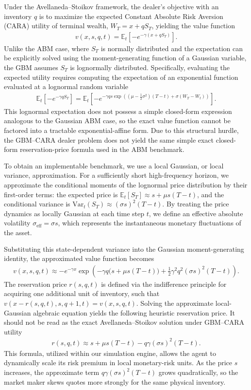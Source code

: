 Under the Avellaneda--Stoikov framework, the dealer's objective with an inventory $q$ is to maximize the expected Constant Absolute Risk Aversion (CARA) utility of terminal wealth, $W_T = x + q S_T$, yielding the value function
\begin{align*}
    v(x, s, q, t) = \mathbb{E}_t \left[ -e^{-\gamma (x + q S_T)} \right].
\end{align*}
Unlike the ABM case, where $S_T$ is normally distributed and the expectation can be explicitly solved using the moment-generating function of a Gaussian variable, the GBM assumes $S_T$ is lognormally distributed. Specifically, evaluating the expected utility requires computing the expectation of an exponential function evaluated at a lognormal random variable
\begin{align*}
    \mathbb{E}_t \left[ -e^{-\gamma q S_T} \right] = \mathbb{E}_t \left[ -e^{-\gamma q s \exp\left((\mu - \frac{1}{2}\sigma^2)(T-t) + \sigma(W_T - W_t)\right)} \right].
\end{align*}
This lognormal expectation does not possess a simple closed-form expression analogous to the Gaussian ABM case, so the exact value function cannot be factored into a tractable exponential-affine form. Due to this structural hurdle, the GBM--CARA dealer problem does not yield the same simple exact closed-form reservation-price formula used in the ABM benchmark.

To obtain an implementable benchmark, we use a local Gaussian, or local variance, approximation. For a sufficiently short high-frequency horizon, we approximate the conditional moments of the lognormal price distribution by their first-order terms: the expected price is $\mathbb{E}_t[S_T] \approx s + \mu s(T-t)$, and the conditional variance is $\text{Var}_t(S_T) \approx (\sigma s)^2(T-t)$. By treating the price dynamics as locally Gaussian at each time step $t$, we define an effective absolute volatility $\sigma_{\text{eff}} = \sigma s$, which represents the instantaneous monetary fluctuations of the asset.

Substituting this state-dependent variance into the Gaussian moment-generating identity, the approximated value function becomes
\begin{align*}
    v(x, s, q, t) \approx -e^{-\gamma x} \exp \left( -\gamma q \big(s + \mu s (T-t)\big) + \frac{1}{2} \gamma^2 q^2 (\sigma s)^2 (T-t) \right).
\end{align*}
The reservation price $r(s, q, t)$ is defined via the indifference principle for acquiring one additional unit of inventory, such that $v(x - r(s,q,t), s, q+1, t) = v(x, s, q, t)$. Solving the approximate local-Gaussian algebraic equation yields the following heuristic reservation price. It should not be read as the exact Avellaneda--Stoikov solution under GBM--CARA utility
\begin{align*}
    r(s, q, t) \approx s + \mu s(T-t) - q\gamma(\sigma s)^2(T-t).
\end{align*}
This formula, utilized within our simulation engine, allows the agent to dynamically scale its risk premium in local monetary-risk units. As the price $s$ increases, the approximate term $q\gamma(\sigma s)^2(T-t)$ grows quadratically, so the market maker skews quotes more strongly for the same physical inventory. 

